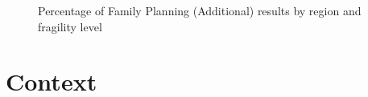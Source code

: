 \begin{figure}
	\centering
	\qquad
	\caption{Percentage of Family Planning (Additional) results by region and fragility level}
	\label{fig:family_additional}
\end{figure}


\section{Context}

